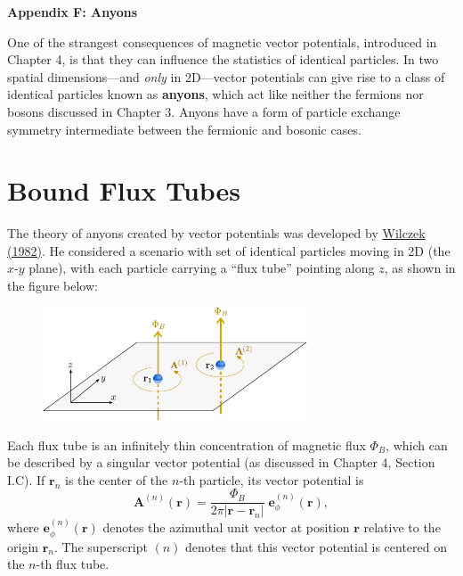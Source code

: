 \documentclass[pra,12pt]{revtex4}
\begin{document}
\begin{center}
{\large \textbf{Appendix F: Anyons}}
\end{center}

One of the strangest consequences of magnetic vector potentials,
introduced in Chapter 4, is that they can influence the statistics of
identical particles.  In two spatial dimensions---and \textit{only} in
2D---vector potentials can give rise to a class of identical particles
known as \textbf{anyons}, which act like neither the fermions nor
bosons discussed in Chapter 3.  Anyons have a form of particle
exchange symmetry intermediate between the fermionic and
bosonic cases.

\section{Bound Flux Tubes}

The theory of anyons created by vector potentials was developed by
\hyperref[cite:wilczek]{Wilczek (1982)}.  He considered a scenario
with set of identical particles moving in 2D (the $x$-$y$ plane), with
each particle carrying a ``flux tube'' pointing along $z$, as shown in
the figure below:

\begin{figure}[h]
  \centering\includegraphics[width=0.7\textwidth]{anyons}
\end{figure}

Each flux tube is an infinitely thin concentration of magnetic flux
$\Phi_B$, which can be described by a singular vector potential (as
discussed in Chapter 4, Section I.C).  If $\mathbf{r}_n$ is the center
of the $n$-th particle, its vector potential is
\begin{equation}
  \mathbf{A}^{(n)}(\mathbf{r}) = \frac{\Phi_B}{2\pi
    |\mathbf{r}-\mathbf{r}_n|} \; \mathbf{e}_\phi^{(n)}(\mathbf{r}),
  \label{Asolenoid}
\end{equation}
where $\mathbf{e}_\phi^{(n)}(\mathbf{r})$ denotes the azimuthal unit
vector at position $\mathbf{r}$ relative to the origin $\mathbf{r}_n$.
The superscript $(n)$ denotes that this vector potential is centered
on the $n$-th flux tube.
\end{document}
